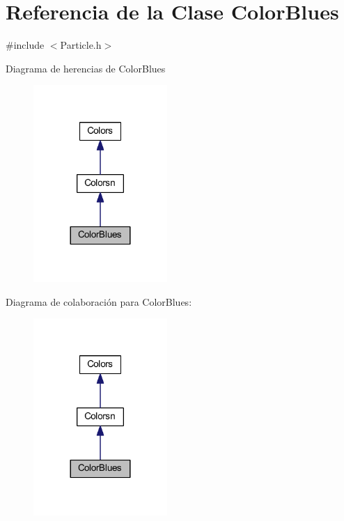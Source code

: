 \hypertarget{class_color_blues}{}\section{Referencia de la Clase Color\+Blues}
\label{class_color_blues}


{\ttfamily \#include $<$Particle.\+h$>$}



Diagrama de herencias de Color\+Blues
\nopagebreak
\begin{figure}[H]
\begin{center}
\leavevmode
\includegraphics[width=144pt]{class_color_blues__inherit__graph}
\end{center}
\end{figure}


Diagrama de colaboración para Color\+Blues\+:
\nopagebreak
\begin{figure}[H]
\begin{center}
\leavevmode
\includegraphics[width=144pt]{class_color_blues__coll__graph}
\end{center}
\end{figure}
